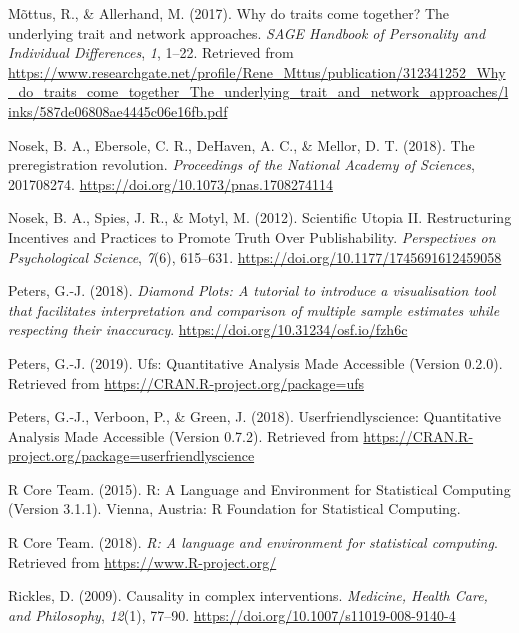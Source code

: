 \documentclass[british,man]{apa6}
\begin{document}
\leavevmode\hypertarget{ref-mottusWhyTraitsCome2017}{}%
Mõttus, R., \& Allerhand, M. (2017). Why do traits come together? The underlying trait and network approaches. \emph{SAGE Handbook of Personality and Individual Differences}, \emph{1}, 1--22. Retrieved from \url{https://www.researchgate.net/profile/Rene_Mttus/publication/312341252_Why_do_traits_come_together_The_underlying_trait_and_network_approaches/links/587de06808ae4445c06e16fb.pdf}

\leavevmode\hypertarget{ref-nosekPreregistrationRevolution2018}{}%
Nosek, B. A., Ebersole, C. R., DeHaven, A. C., \& Mellor, D. T. (2018). The preregistration revolution. \emph{Proceedings of the National Academy of Sciences}, 201708274. \url{https://doi.org/10.1073/pnas.1708274114}

\leavevmode\hypertarget{ref-nosekScientificUtopiaII2012a}{}%
Nosek, B. A., Spies, J. R., \& Motyl, M. (2012). Scientific Utopia II. Restructuring Incentives and Practices to Promote Truth Over Publishability. \emph{Perspectives on Psychological Science}, \emph{7}(6), 615--631. \url{https://doi.org/10.1177/1745691612459058}

\leavevmode\hypertarget{ref-petersDiamondPlotsTutorial2018}{}%
Peters, G.-J. (2018). \emph{Diamond Plots: A tutorial to introduce a visualisation tool that facilitates interpretation and comparison of multiple sample estimates while respecting their inaccuracy}. \url{https://doi.org/10.31234/osf.io/fzh6c}

\leavevmode\hypertarget{ref-petersUfsQuantitativeAnalysis2019}{}%
Peters, G.-J. (2019). Ufs: Quantitative Analysis Made Accessible (Version 0.2.0). Retrieved from \url{https://CRAN.R-project.org/package=ufs}

\leavevmode\hypertarget{ref-petersUserfriendlyscienceQuantitativeAnalysis2018}{}%
Peters, G.-J., Verboon, P., \& Green, J. (2018). Userfriendlyscience: Quantitative Analysis Made Accessible (Version 0.7.2). Retrieved from \url{https://CRAN.R-project.org/package=userfriendlyscience}

\leavevmode\hypertarget{ref-rcoreteamLanguageEnvironmentStatistical2015}{}%
R Core Team. (2015). R: A Language and Environment for Statistical Computing (Version 3.1.1). Vienna, Austria: R Foundation for Statistical Computing.

\leavevmode\hypertarget{ref-R-base}{}%
R Core Team. (2018). \emph{R: A language and environment for statistical computing}. Retrieved from \url{https://www.R-project.org/}

\leavevmode\hypertarget{ref-ricklesCausalityComplexInterventions2009}{}%
Rickles, D. (2009). Causality in complex interventions. \emph{Medicine, Health Care, and Philosophy}, \emph{12}(1), 77--90. \url{https://doi.org/10.1007/s11019-008-9140-4}
\end{document}
